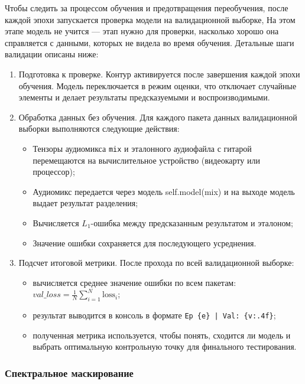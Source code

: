 \documentclass[14pt]{extarticle}
\begin{document}
Чтобы следить за процессом обучения и предотвращения переобучения, после каждой эпохи запускается проверка модели на валидационной выборке, 
На этом этапе модель не учится --- этап нужно для проверки, насколько хорошо она справляется с данными, которых не видела во время обучения. 
Детальные шаги валидации описаны ниже:
\begin{enumerate}[label=\arabic*)]
    \item Подготовка к проверке. Контур активируется после завершения каждой эпохи обучения. Модель переключается в режим оценки, что отключает случайные элементы и делает результаты предсказуемыми и воспроизводимыми.
    \item Обработка данных без обучения. Для каждого пакета данных валидационной выборки выполняются следующие действия:
    \begin{itemize}[label=$\bullet$, wide]
        \item Тензоры аудиомикса \texttt{mix} и эталонного аудиофайла с гитарой перемещаются на вычислительное устройство (видеокарту или процессор);
        \item Аудиомикс передается через модель self.model(mix) и на выходе модель выдает результат разделения;
        \item Вычисляется $L_1$-ошибка между предсказанным результатом и эталоном;
        \item Значение ошибки сохраняется для последующего усреднения.
    \end{itemize}
    \item Подсчет итоговой метрики. После прохода по всей валидационной выборке:
    \begin{itemize}[label=$\bullet$, wide]
        \item вычисляется среднее значение ошибки по всем пакетам: $val\_loss = \frac{1}{N} \sum_{i=1}^{N} \mathrm{loss}_i$;
        \item результат выводится в консоль в формате \texttt{Ep \{e\} | Val: \{v:.4f\}};
        \item полученная метрика используется, чтобы понять, сходится ли модель и выбрать оптимальную контрольную точку для финального тестирования.
    \end{itemize}
\end{enumerate}

\subsubsection{Спектральное маскирование}
\end{document}

